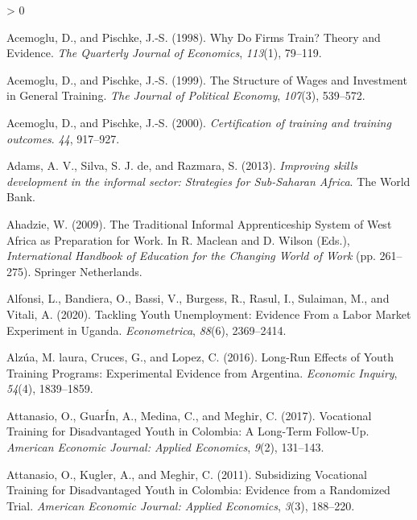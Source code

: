 \documentclass[
  11pt,
a4paper
]{article}
\newlength{\cslhangindent}
\newenvironment{CSLReferences}[2] %
 {%
  \setlength{\parindent}{0pt}
  \ifodd #1 \everypar{\setlength{\hangindent}{\cslhangindent}}\ignorespaces\fi
  \ifnum #2 > 0
  \setlength{\parskip}{#2\baselineskip}
  \fi
 }%
 {}
\begin{document}
\hypertarget{refs}{}
\begin{CSLReferences}{1}{0}
\leavevmode\hypertarget{ref-acemogluWhyFirmsTrain1998}{}%
Acemoglu, D., and Pischke, J.-S. (1998). Why {Do Firms Train}? {Theory} and {Evidence}. \emph{The Quarterly Journal of Economics}, \emph{113}(1), 79--119.

\leavevmode\hypertarget{ref-acemogluStructureWagesInvestment1999}{}%
Acemoglu, D., and Pischke, J.-S. (1999). The {Structure} of {Wages} and {Investment} in {General Training}. \emph{The Journal of Political Economy}, \emph{107}(3), 539--572.

\leavevmode\hypertarget{ref-acemogluCertificationTrainingTraining2000}{}%
Acemoglu, D., and Pischke, J.-S. (2000). \emph{Certification of training and training outcomes}. \emph{44}, 917--927.

\leavevmode\hypertarget{ref-adams2013}{}%
Adams, A. V., Silva, S. J. de, and Razmara, S. (2013). \emph{Improving skills development in the informal sector: Strategies for {Sub-Saharan Africa}}. {The World Bank}.

\leavevmode\hypertarget{ref-ahadzie2009}{}%
Ahadzie, W. (2009). The {Traditional Informal Apprenticeship System} of {West Africa} as {Preparation} for {Work}. In R. Maclean and D. Wilson (Eds.), \emph{International {Handbook} of {Education} for the {Changing World} of {Work}} (pp. 261--275). {Springer Netherlands}.

\leavevmode\hypertarget{ref-alfonsi2020}{}%
Alfonsi, L., Bandiera, O., Bassi, V., Burgess, R., Rasul, I., Sulaiman, M., and Vitali, A. (2020). Tackling {Youth Unemployment}: {Evidence From} a {Labor Market Experiment} in {Uganda}. \emph{Econometrica}, \emph{88}(6), 2369--2414.

\leavevmode\hypertarget{ref-alzua2016}{}%
Alzúa, M. laura, Cruces, G., and Lopez, C. (2016). Long-{Run Effects} of {Youth Training Programs}: {Experimental Evidence} from {Argentina}. \emph{Economic Inquiry}, \emph{54}(4), 1839--1859.

\leavevmode\hypertarget{ref-attanasio2017}{}%
Attanasio, O., GuarÍn, A., Medina, C., and Meghir, C. (2017). Vocational {Training} for {Disadvantaged Youth} in {Colombia}: {A Long-Term Follow-Up}. \emph{American Economic Journal: Applied Economics}, \emph{9}(2), 131--143.

\leavevmode\hypertarget{ref-attanasio2011}{}%
Attanasio, O., Kugler, A., and Meghir, C. (2011). Subsidizing {Vocational Training} for {Disadvantaged Youth} in {Colombia}: {Evidence} from a {Randomized Trial}. \emph{American Economic Journal: Applied Economics}, \emph{3}(3), 188--220.


\end{CSLReferences}
\end{document}
